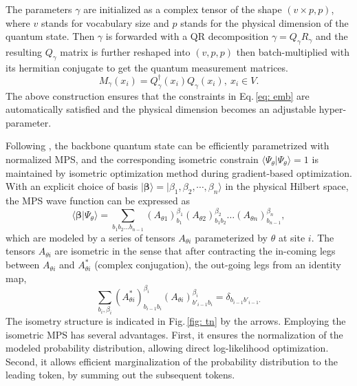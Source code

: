 \documentclass[aps,prb,twocolumn,superscriptaddress]{revtex4-2}
\newcommand{\ket}[1]{|#1 \rangle}
\newcommand{\braket}[2]{\langle #1|#2 \rangle}
\newcommand{\vect}[1]{{\bm{#1}}}
\newcommand{\eqnref}[1]{Eq.\,\eqref{#1}}
\newcommand{\figref}[1]{Fig.\,\ref{#1}}
\begin{document}
The parameters $\gamma$ are initialized as a complex tensor of the shape $(v \times p, p)$, where $v$ stands for vocabulary size and $p$ stands for the physical dimension of the quantum state. Then $\gamma$ is forwarded with a QR decomposition $\gamma=Q_\gamma R_\gamma$ and the resulting $Q_{\gamma}$ matrix is further reshaped into $(v, p, p)$ then batch-multiplied with its hermitian conjugate to get the quantum measurement matrices. 
\begin{equation}\label{eq: parametrization}
    M_{\gamma}(x_{i})=Q^{\dagger}_{\gamma}(x_i)Q_{\gamma}(x_i), \ x_i\in V.
\end{equation}
The above construction ensures that the constraints in \eqnref{eq: emb} are automatically satisfied and the physical dimension becomes an adjustable hyper-parameter.

Following \cite{PhysRevX.8.031012}, the backbone quantum state can be efficiently parametrized with normalized MPS, and the corresponding isometric constrain $\braket{\Psi_\theta}{\Psi_\theta}=1$ is maintained by isometric optimization method during gradient-based optimization\cite{wen2013feasible,2022MLS&T...3a5020G}. With an explicit choice of basis $\ket{\vect{\beta}}=\ket{\beta_1,\beta_2,\cdots,\beta_n}$ in the physical Hilbert space, the MPS wave function can be expressed as 
\begin{equation}\label{eq: mps}
\braket{\vect{\beta}}{\Psi_\theta}=\sum_{b_1 b_2...b_{n-1}}(A_{\theta 1})^{\beta_1}_{b_1} (A_{\theta 2})^{\beta_2}_{b_1 b_2}\dots (A_{\theta n})^{\beta_n}_{b_{n-1}},
\end{equation}
which are modeled by a series of tensors $A_{\theta i}$ parameterized by $\theta$ at site $i$. The tensors $A_{\theta i}$ are isometric in the sense that after contracting the in-coming legs between $A_{\theta i}$ and $A_{\theta i}^*$ (complex conjugation), the out-going legs from an identity map,
\begin{equation}
\sum_{b_i,\beta_i} (A_{\theta i}^*)_{b_{i-1}b_{i}}^{\beta_i}(A_{\theta i})_{b'_{i-1}b_{i}}^{\beta_i}=\delta_{b_{i-1}b'_{i-1}.}
\end{equation}
The isometry structure is indicated in \figref{fig: tn} by the arrows. Employing the isometric MPS has several advantages. First, it ensures the normalization of the modeled probability distribution, allowing direct log-likelihood optimization. Second, 
it allows efficient marginalization of the probability distribution to the leading token, by summing out the subsequent tokens.
\end{document}
